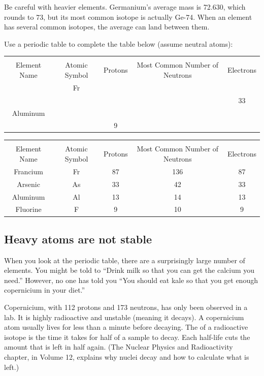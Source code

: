 Be careful with heavier elements. Germanium's average mass is 72.630, which rounds to 73, but its most common isotope is actually Ge-74. When an element has several common isotopes, the average can land between them.

\begin{Exercise}[title = {Determining Numbers of Subatomic Particles}, label = pne]
Use a periodic table to complete the table below (assume neutral atoms): %

\begin{tabular}{|c|c|c|c|c|}
\hline\\
Element Name & Atomic Symbol & Protons & Most Common Number of Neutrons & Electrons\\\hline
 & Fr & & & \\\hline
 & & & & 33\\\hline
 Aluminum & & & & \\\hline
  & & 9 & & \\\hline
\end{tabular}
\end{Exercise}

\begin{Answer}[ref = pne]
\begin{tabular}{|c|c|c|c|c|}
\hline\\
Element Name & Atomic Symbol & Protons & Most Common Number of Neutrons & Electrons\\\hline
 Francium & Fr & 87 & 136 & 87 \\\hline
 Arsenic & As & 33 & 42 & 33 \\\hline
 Aluminum & Al & 13 & 14 & 13 \\\hline
 Fluorine & F & 9 & 10 & 9 \\\hline
\end{tabular}
\end{Answer}




\subsection{Heavy atoms are not stable}

When you look at the periodic table, there are a surprisingly large
number of elements. You might be told to ``Drink milk so that you can
get the calcium you need.'' However, no one has told you ``You should
eat kale so that you get enough copernicium in your diet.''

Copernicium, with 112 protons and 173 neutrons, has only been observed
 in a lab. It is highly radioactive and unstable (meaning it decays). A copernicium
atom usually lives for less than a minute before decaying.
The  of a radioactive isotope is the time it takes for half of a sample to decay. Each half-life cuts the amount that is left in half again. (The Nuclear Physics and Radioactivity chapter, in Volume 12, explains why nuclei decay and how to calculate what is left.)

